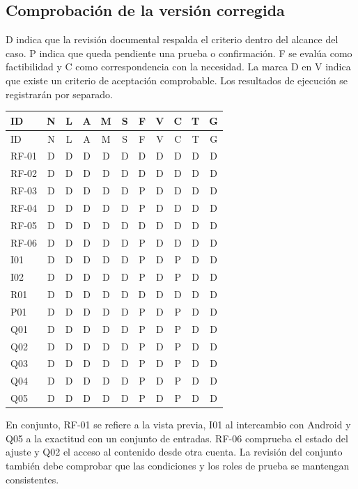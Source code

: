 \documentclass[11pt,a4paper]{article}
\begin{document}
\subsection{Comprobación de la versión corregida}
D indica que la revisión documental respalda el criterio dentro del alcance del caso. P indica que queda pendiente una prueba o confirmación. F se evalúa como factibilidad y C como correspondencia con la necesidad. La marca D en V indica que existe un criterio de aceptación comprobable. Los resultados de ejecución se registrarán por separado.
{\small
\begin{longtable}{@{}l*{10}{c}@{}}
\toprule ID & N & L & A & M & S & F & V & C & T & G\\\midrule
\endfirsthead
\toprule ID & N & L & A & M & S & F & V & C & T & G\\\midrule
\endhead
\midrule\endfoot
\bottomrule\endlastfoot
RF-01 & D & D & D & D & D & D & D & D & D & D\\
RF-02 & D & D & D & D & D & D & D & D & D & D\\
RF-03 & D & D & D & D & D & P & D & D & D & D\\
RF-04 & D & D & D & D & D & P & D & D & D & D\\
RF-05 & D & D & D & D & D & D & D & D & D & D\\
RF-06 & D & D & D & D & D & P & D & D & D & D\\
I01 & D & D & D & D & D & P & D & P & D & D\\
I02 & D & D & D & D & D & P & D & P & D & D\\
R01 & D & D & D & D & D & D & D & D & D & D\\
P01 & D & D & D & D & D & P & D & P & D & D\\
Q01 & D & D & D & D & D & P & D & P & D & D\\
Q02 & D & D & D & D & D & P & D & P & D & D\\
Q03 & D & D & D & D & D & P & D & P & D & D\\
Q04 & D & D & D & D & D & P & D & P & D & D\\
Q05 & D & D & D & D & D & P & D & P & D & D\\
\end{longtable}}
En conjunto, RF-01 se refiere a la vista previa, I01 al intercambio con Android y Q05 a la exactitud con un conjunto de entradas. RF-06 comprueba el estado del ajuste y Q02 el acceso al contenido desde otra cuenta. La revisión del conjunto también debe comprobar que las condiciones y los roles de prueba se mantengan consistentes.
\Needspace{10cm}
\end{document}
